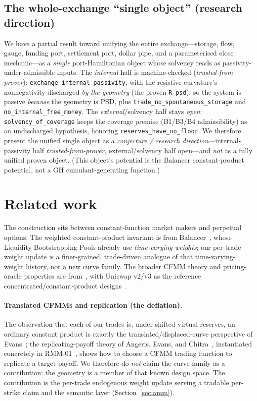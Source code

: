 \documentclass[runningheads]{llncs}
\newcommand{\tfp}{\emph{trusted-from-prover}}
\begin{document}
\subsection{The whole-exchange ``single object'' (research direction)}
We have a partial result toward unifying the entire exchange---storage, flow,
gauge, funding port, settlement port, dollar pipe, and a parameterised close
mechanic---as a \emph{single} port-Hamiltonian object whose solvency reads as
passivity-under-admissible-inputs. The \emph{internal} half is machine-checked
(\tfp{}): \texttt{exchange\_internal\_passivity}, with the resistive curvature's
nonnegativity discharged \emph{by the geometry} (the proven \texttt{R\_psd}), so
the system is passive \emph{because} the geometry is PSD, plus
\texttt{trade\_no\_spontaneous\_storage} and \texttt{no\_internal\_free\_money}.
The \emph{external}/solvency half stays \emph{open}: \texttt{solvency\_of\_coverage}
keeps the coverage premise (B1/B3/B4 admissibility) as an undischarged hypothesis,
honoring \texttt{reserves\_have\_no\_floor}. We therefore present the unified
single object as a \emph{conjecture / research direction}---internal-passivity
half \tfp{}, external/solvency half open---and \emph{not} as a fully unified proven
object. (This object's potential is the Balancer constant-product potential, not a
GH cumulant-generating function.)

\section{Related work}\label{sec:related}

The construction sits between constant-function market makers and perpetual
options. The weighted constant-product invariant is from Balancer~\cite{balancer},
whose Liquidity Bootstrapping Pools already use \emph{time-varying weights}; our
per-trade weight update is a finer-grained, trade-driven analogue of that
time-varying-weight history, not a new curve family. The broader CFMM theory and
pricing-oracle properties are from~\cite{angeris-cfmm,angeris-uniswap}, with
Uniswap v2/v3 as the reference concentrated/constant-product
designs~\cite{uniswapv2,uniswapv3}.

\paragraph{Translated CFMMs and replication (the deflation).}
The observation that each of our trades is, under shifted virtual reserves, an
ordinary constant product is exactly the translated/displaced-curve perspective of
Evans~\cite{evans2020}; the replicating-payoff theory of
Angeris, Evans, and Chitra~\cite{angeris-replicating}, instantiated concretely in
RMM-01~\cite{rmm01}, shows how to choose a CFMM trading function to replicate a
target payoff. We therefore do \emph{not} claim the curve family as a
contribution: the geometry is a member of that known design space. The
contribution is the per-trade endogenous weight update serving a tradable
per-strike claim and the semantic layer (Section~\ref{sec:amm}).
\end{document}
